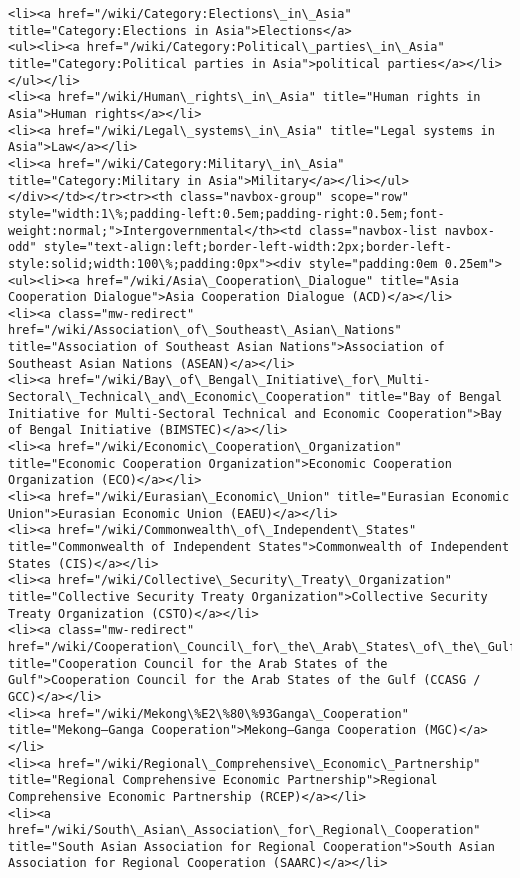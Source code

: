 \documentclass[11pt]{article}
\begin{document}
\begin{Verbatim}[commandchars=\\\{\}]
<li><a href="/wiki/Category:Elections\_in\_Asia" title="Category:Elections in Asia">Elections</a>
<ul><li><a href="/wiki/Category:Political\_parties\_in\_Asia" title="Category:Political parties in Asia">political parties</a></li></ul></li>
<li><a href="/wiki/Human\_rights\_in\_Asia" title="Human rights in Asia">Human rights</a></li>
<li><a href="/wiki/Legal\_systems\_in\_Asia" title="Legal systems in Asia">Law</a></li>
<li><a href="/wiki/Category:Military\_in\_Asia" title="Category:Military in Asia">Military</a></li></ul>
</div></td></tr><tr><th class="navbox-group" scope="row" style="width:1\%;padding-left:0.5em;padding-right:0.5em;font-weight:normal;">Intergovernmental</th><td class="navbox-list navbox-odd" style="text-align:left;border-left-width:2px;border-left-style:solid;width:100\%;padding:0px"><div style="padding:0em 0.25em">
<ul><li><a href="/wiki/Asia\_Cooperation\_Dialogue" title="Asia Cooperation Dialogue">Asia Cooperation Dialogue (ACD)</a></li>
<li><a class="mw-redirect" href="/wiki/Association\_of\_Southeast\_Asian\_Nations" title="Association of Southeast Asian Nations">Association of Southeast Asian Nations (ASEAN)</a></li>
<li><a href="/wiki/Bay\_of\_Bengal\_Initiative\_for\_Multi-Sectoral\_Technical\_and\_Economic\_Cooperation" title="Bay of Bengal Initiative for Multi-Sectoral Technical and Economic Cooperation">Bay of Bengal Initiative (BIMSTEC)</a></li>
<li><a href="/wiki/Economic\_Cooperation\_Organization" title="Economic Cooperation Organization">Economic Cooperation Organization (ECO)</a></li>
<li><a href="/wiki/Eurasian\_Economic\_Union" title="Eurasian Economic Union">Eurasian Economic Union (EAEU)</a></li>
<li><a href="/wiki/Commonwealth\_of\_Independent\_States" title="Commonwealth of Independent States">Commonwealth of Independent States (CIS)</a></li>
<li><a href="/wiki/Collective\_Security\_Treaty\_Organization" title="Collective Security Treaty Organization">Collective Security Treaty Organization (CSTO)</a></li>
<li><a class="mw-redirect" href="/wiki/Cooperation\_Council\_for\_the\_Arab\_States\_of\_the\_Gulf" title="Cooperation Council for the Arab States of the Gulf">Cooperation Council for the Arab States of the Gulf (CCASG / GCC)</a></li>
<li><a href="/wiki/Mekong\%E2\%80\%93Ganga\_Cooperation" title="Mekong–Ganga Cooperation">Mekong–Ganga Cooperation (MGC)</a></li>
<li><a href="/wiki/Regional\_Comprehensive\_Economic\_Partnership" title="Regional Comprehensive Economic Partnership">Regional Comprehensive Economic Partnership (RCEP)</a></li>
<li><a href="/wiki/South\_Asian\_Association\_for\_Regional\_Cooperation" title="South Asian Association for Regional Cooperation">South Asian Association for Regional Cooperation (SAARC)</a></li>

\end{Verbatim}
\end{document}
